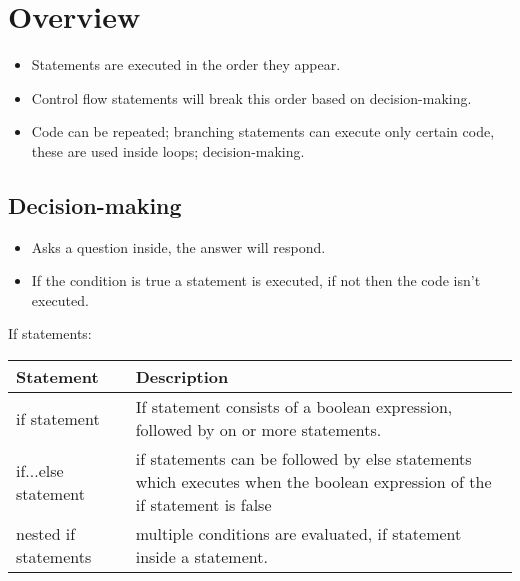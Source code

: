 \section{Overview}
\begin{itemize}
    \item Statements are executed in the order they appear. 
    \item Control flow statements will break this order based on decision-making. 
    \item Code can be repeated; branching statements can execute only certain code, these are used inside loops; decision-making.  
\end{itemize}
\subsection{Decision-making}
\begin{itemize}
    \item Asks a question inside, the answer will respond. 
    \item If the condition is true a statement is executed, if not then the code isn't executed.  
\end{itemize}
If statements: 
\begin{center}
    \begin{tabular}{ |p{5cm}|p{7cm}| }
        \hline
            Statement & Description \\
        \hline \hline
            if statement & If statement consists of a boolean expression, followed by on or more statements. \\ 
        \hline
            if...else statement & if statements can be followed by else statements which executes when the boolean expression of the if statement is false \\ 
        \hline
            nested if statements & multiple conditions are evaluated, if statement inside a statement. \\ 
        \hline
    \end{tabular}
\end{center}
